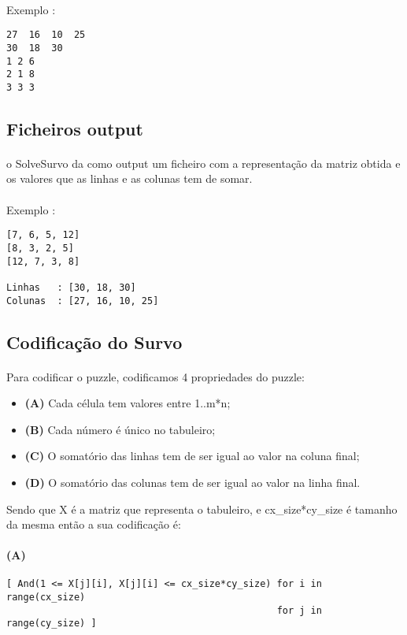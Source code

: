 \documentclass{article}
\begin{document}
\paragraph{}
Exemplo :
\begin{verbatim}
27	16	10	25
30	18	30
1 2 6
2 1 8
3 3 3
\end{verbatim} 

\subsection{Ficheiros output}
\paragraph{} o SolveSurvo da como output um ficheiro com a representação da matriz obtida e os valores que as linhas e as colunas tem de somar.

\paragraph{}
Exemplo :
\begin{verbatim}
[7, 6, 5, 12]
[8, 3, 2, 5]
[12, 7, 3, 8]

Linhas   : [30, 18, 30]
Colunas  : [27, 16, 10, 25]
\end{verbatim}

\subsection{Codificação do Survo}
\paragraph{} Para codificar o puzzle, codificamos 4 propriedades do puzzle:
 \begin{itemize}
 \item \textbf{(A)} Cada célula tem valores entre 1..m*n;
 \item \textbf{(B)} Cada número é único no tabuleiro;
 \item \textbf{(C)} O somatório das linhas tem de ser igual ao valor na coluna final;
 \item \textbf{(D)} O somatório das colunas tem de ser igual ao valor na linha final.
 \end{itemize}

Sendo que X é a matriz que representa o tabuleiro, e cx\_size*cy\_size é tamanho da mesma então a sua codificação é:

\paragraph{(A)}
\begin{verbatim}
[ And(1 <= X[j][i], X[j][i] <= cx_size*cy_size) for i in range(cx_size) 
												for j in range(cy_size) ]
\end{verbatim}
\end{document}
